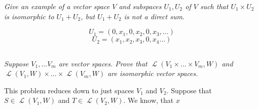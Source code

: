 \documentclass[11pt,oneside,titlepage]{book}
\DeclareMathOperator \map {\mathcal {L}}
\begin{document}
\textit{Give an example of a vector space $V$ and subspaces $U_1, U_2$ of $V$ such that
  $U_1 \times U_2$ is isomorphic to $U_1 + U_2$, but $U_1 + U_2$ is not a direct sum.}

$$U_1 = (0, x_1, 0, x_2, 0, x_3, ...)$$
$$U_2 = (x_1, x_2, x_3, 0, x_4 ...)$$

\subsection{}

\textit{Suppose $V_1, ... V_m$ are vector spaces. Prove that $\map(V_1 \times ... \times V_m, W)$
  and $\map(V_1, W) \times ... \times \map(V_m, W)$ are isomorphic vector spaces.}

This problem reduces down to just spaces $V_1$ and $V_2$. Suppose that $S \in \map(V_1, W)$
and $T \in \map(V_2, W)$. We know, that $x$ 
\end{document}
